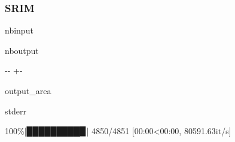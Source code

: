 \documentclass[letterpaper,10pt,english]{sphinxmanual}
\begin{document}
\subsubsection{SRIM}
\label{\detokenize{examples/01_SISO_Intro:SRIM}}
\begin{sphinxuseclass}{nbinput}
{
\begin{sphinxVerbatim}[commandchars=\\\{\}]
\llap{\color{nbsphinxin}[12]:\,\hspace{\fboxrule}\hspace{\fboxsep}}
  
\PYG{p}{[}\PYG{p}{]}       
\PYG{p}{[}\PYG{p}{]}\PYG{p}{[}\PYG{p}{]}  
\end{sphinxVerbatim}
}

\end{sphinxuseclass}
\begin{sphinxuseclass}{nboutput}
{

\kern-\sphinxverbatimsmallskipamount\kern-\baselineskip
\kern+\FrameHeightAdjust\kern-\fboxrule
\vspace{\nbsphinxcodecellspacing}

\begin{sphinxuseclass}{output_area}
\begin{sphinxuseclass}{stderr}


\begin{sphinxVerbatim}[commandchars=\\\{\}]
100\%|█████████▉| 4850/4851 [00:00<00:00, 80591.63it/s]
\end{sphinxVerbatim}



\end{sphinxuseclass}
\end{sphinxuseclass}
}

\end{sphinxuseclass}
\end{document}
